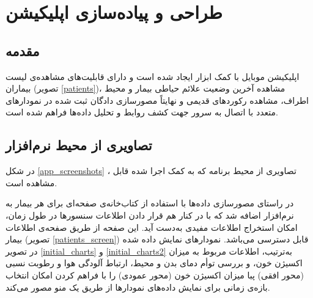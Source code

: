 \section{طراحی و پیاده‌سازی اپلیکیشن}
\subsection{مقدمه}
اپلیکیشن موبایل با کمک ابزار  ایجاد شده است و دارای قابلیت‌های مشاهده‌ی لیست بیماران (تصویر \ref{patients})، مشاهده آخرین وضعیت علائم حیاطی بیمار و محیط اطراف، مشاهده رکوردهای قدیمی و نهایتاً مصورسازی دادگان ثبت شده در نمودارهای متعدد با اتصال به سرور جهت کشف روابط و تحلیل داده‌ها فراهم شده است.

\subsection{تصاویری از محیط نرم‌افزار}
در شکل
\ref{app_screenshots}
، تصاویری از محیط برنامه که به کمک  اجرا شده قابل مشاهده است.

در راستای مصورسازی داده‌ها با استفاده از کتاب‌خانه‌ی  صفحه‌ای برای هر بیمار به نرم‌افزار اضافه شد که با در کنار هم قرار دادن اطلاعات سنسورها در طول زمان، امکان استخراج اطلاعات مفیدی به‌دست آید. این صفحه از طریق صفحه‌ی اطلاعات بیمار (تصویر \ref{patients_screen}) قابل دسترسی می‌باشد. نمودارهای نمایش داده شده در تصویر
\ref{initial_charts}
و
\ref{initial_charts2}
به‌ترتیب، اطلاعات مربوط به میزان اکسیژن خون، و بررسی توأم دمای بدن و محیط، ارتباط آلودگی هوا و رطوبت نسبی (محور افقی) پبا میزان اکسیژن خون (محور عمودی) را با فراهم کردن امکان انتخاب بازه‌ی زمانی برای نمایش داده‌های نمودارها از طریق یک منو مصور می‌کند.

